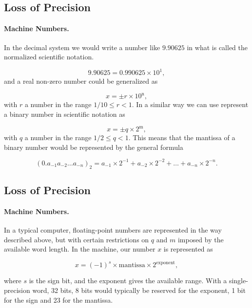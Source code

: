 \documentclass[%
twoside,                 %
final,                   %
10pt]{article}
\newenvironment{paragraphadmon}[1][]{\paragraph{#1}}{}
\begin{document}
\subsection{Loss of Precision}


\begin{paragraphadmon}[Machine Numbers.]
In the decimal system we would write a number like $9.90625$
in what is called the normalized scientific notation.

\[
  9.90625=0.990625\times 10^{1},
\]
and a real non-zero number could be generalized as

\begin{equation}
    x=\pm r\times 10^{{\mbox{n}}},
\end{equation}
with $r$ a number in the range $1/10 \le r < 1$.
In a similar way we can use represent a binary number in
scientific notation as

\begin{equation}
    x=\pm q\times 2^{{\mbox{m}}},
\end{equation}
with $q$ a number in the range $1/2 \le q < 1$.
This means that the mantissa of a binary number would be represented by
the general formula

\begin{equation}
(0.a_{-1}a_{-2}\dots a_{-n})_2=a_{-1}\times 2^{-1}
+a_{-2}\times 2^{-2}+\dots+a_{-n}\times 2^{-n}.
\end{equation}
\end{paragraphadmon}



\subsection{Loss of Precision}


\begin{paragraphadmon}[Machine Numbers.]
In a typical computer, floating-point numbers are represented
in the way described above, but with certain restrictions
on $q$ and $m$ imposed by the available word length.
In the machine, our
number $x$ is represented as

\begin{equation}
    x=(-1)^s\times {\mbox{mantissa}}\times 2^{{\mbox{exponent}}},
\end{equation}

where $s$ is the sign bit, and the exponent gives the available range.
With a single-precision word, 32 bits, 8 bits would typically be reserved
for the exponent,  1 bit for the sign and 23 for the mantissa.
\end{paragraphadmon}
\end{document}

